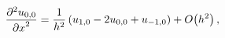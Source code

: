 \[\frac{{\partial}^{2}u_{0,0}}{{\partial x}^{2}}=\frac{1}{h^{2}}\,(u_{1,0}-2u_{0%
,0}+u_{-1,0})+\mathop{O\/}\nolimits\!\left(h^{2}\right),\]